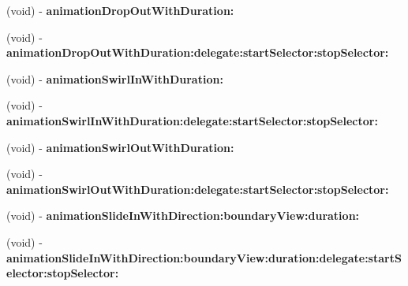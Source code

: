 \begin{DoxyCompactItemize}
\item 
\hypertarget{category_u_i_view_07_t_x_s_animations_08_ad7e26abd2af44484d23e9afe254174d4}{}(void) -\/ {\bfseries animation\+Drop\+Out\+With\+Duration\+:}\label{category_u_i_view_07_t_x_s_animations_08_ad7e26abd2af44484d23e9afe254174d4}

\item 
\hypertarget{category_u_i_view_07_t_x_s_animations_08_a621bfa535aec5d8437c28c52627d098c}{}(void) -\/ {\bfseries animation\+Drop\+Out\+With\+Duration\+:delegate\+:start\+Selector\+:stop\+Selector\+:}\label{category_u_i_view_07_t_x_s_animations_08_a621bfa535aec5d8437c28c52627d098c}

\item 
\hypertarget{category_u_i_view_07_t_x_s_animations_08_a8e4b2079fb5348741ce8a6cb27fbfbff}{}(void) -\/ {\bfseries animation\+Swirl\+In\+With\+Duration\+:}\label{category_u_i_view_07_t_x_s_animations_08_a8e4b2079fb5348741ce8a6cb27fbfbff}

\item 
\hypertarget{category_u_i_view_07_t_x_s_animations_08_a2f46fb261d94a926a6a030aa3eb04e18}{}(void) -\/ {\bfseries animation\+Swirl\+In\+With\+Duration\+:delegate\+:start\+Selector\+:stop\+Selector\+:}\label{category_u_i_view_07_t_x_s_animations_08_a2f46fb261d94a926a6a030aa3eb04e18}

\item 
\hypertarget{category_u_i_view_07_t_x_s_animations_08_a4ace18671d8fa32e383203bf61f009a6}{}(void) -\/ {\bfseries animation\+Swirl\+Out\+With\+Duration\+:}\label{category_u_i_view_07_t_x_s_animations_08_a4ace18671d8fa32e383203bf61f009a6}

\item 
\hypertarget{category_u_i_view_07_t_x_s_animations_08_a5b4a6e9f5f628c2ae0db8b7d122e1533}{}(void) -\/ {\bfseries animation\+Swirl\+Out\+With\+Duration\+:delegate\+:start\+Selector\+:stop\+Selector\+:}\label{category_u_i_view_07_t_x_s_animations_08_a5b4a6e9f5f628c2ae0db8b7d122e1533}

\item 
\hypertarget{category_u_i_view_07_t_x_s_animations_08_a625d02436bebd42d6d3ba2596f563b7c}{}(void) -\/ {\bfseries animation\+Slide\+In\+With\+Direction\+:boundary\+View\+:duration\+:}\label{category_u_i_view_07_t_x_s_animations_08_a625d02436bebd42d6d3ba2596f563b7c}

\item 
\hypertarget{category_u_i_view_07_t_x_s_animations_08_af78209364c658fb15a10cb2c8c8a7ce2}{}(void) -\/ {\bfseries animation\+Slide\+In\+With\+Direction\+:boundary\+View\+:duration\+:delegate\+:start\+Selector\+:stop\+Selector\+:}\label{category_u_i_view_07_t_x_s_animations_08_af78209364c658fb15a10cb2c8c8a7ce2}


\end{DoxyCompactItemize}
